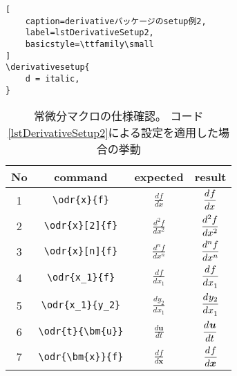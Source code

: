 \documentclass{jsarticle}
\begin{document}
\begin{table}[p]
\begin{lstlisting}[
	caption=derivativeパッケージのsetup例2,
	label=lstDerivativeSetup2,
	basicstyle=\ttfamily\small
]
\derivativesetup{
	d = italic,
}
\end{lstlisting}
\end{table}
%
\begin{table}[p]
\centering
\caption{
	常微分マクロの仕様確認。
	コード\ref{lstDerivativeSetup2}による設定を適用した場合の挙動
}
\begin{tabular}{cccc}
No & command & expected & result \\
\hline
1&	\verb|\odr{x}{f}|				& $\displaystyle \frac{d f}{d x}$
									& $\displaystyle \odr{x}{f}$ \\[3mm]
2&	\verb|\odr{x}[2]{f}|			& $\displaystyle \frac{d^2 f}{d x^2}$
									& $\displaystyle \odr{x}[2]{f}$ \\[3mm]
3&	\verb|\odr{x}[n]{f}|			& $\displaystyle \frac{d^n f}{d x^n}$
									& $\displaystyle \odr{x}[n]{f}$ \\[3mm]
4&	\verb|\odr{x_1}{f}|				& $\displaystyle \frac{d f}{d x_1}$
									& $\displaystyle \odr{x_1}{f}$ \\[3mm]
5&	\verb|\odr{x_1}{y_2}|			& $\displaystyle \frac{d y_2}{d x_1}$
									& $\displaystyle \odr{x_1}{y_2}$ \\[3mm]
6&	\verb|\odr{t}{\bm{u}}|			& $\displaystyle \frac{d\bm{u}}{d t}$
									& $\displaystyle \odr{t}{\bm{u}}$ \\[3mm]
7&	\verb|\odr{\bm{x}}{f}|			& $\displaystyle \frac{d f}{d\bm{x}}$
									& $\displaystyle \odr{\bm{x}}{f}$ \\[3mm]
\end{tabular}
\end{table}
\end{document}
